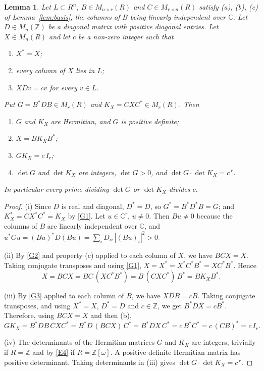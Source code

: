 \documentclass[11pt,a4paper]{article}
\newtheorem{lemma}[theorem]{Lemma}
\theoremstyle{remark}
\newcommand{\ZZ}{\mathbb{Z}}
\newcommand{\CC}{\mathbb{C}}
\begin{document}
\begin{lemma}\label{lem:gram}
Let $L\subset R^n$, $B\in M_{n\times r}(R)$ and $C\in M_{r\times n}(R)$ satisfy (a), (b), (c) of
Lemma~\ref{lem:basis}, the columns of $B$ being linearly independent over $\CC$. Let $D\in M_n(\ZZ)$ be a diagonal
matrix with positive diagonal entries. Let $X\in M_n(R)$ and let $c$ be a non-zero integer such that
\begin{enumerate}[label=(G\arabic*),leftmargin=3em]
\item\label{G1} $X^*=X$;
\item\label{G2} every column of $X$ lies in $L$;
\item\label{G3} $XDv=cv$ for every $v\in L$.
\end{enumerate}
Put $G=B^*DB\in M_r(R)$ and $K_X=CXC^*\in M_r(R)$. Then
\begin{enumerate}[label=(\roman*)]
\item $G$ and $K_X$ are Hermitian, and $G$ is positive definite;
\item $X=BK_XB^*$;
\item $GK_X=c\,I_r$;
\item $\det G$ and $\det K_X$ are integers, $\det G>0$, and $\det G\cdot\det K_X=c^{\,r}$.
\end{enumerate}
In particular every prime dividing $\det G$ or $\det K_X$ divides $c$.
\end{lemma}
\begin{proof}
(i) Since $D$ is real and diagonal, $D^*=D$, so $G^*=B^*D^*B=G$; and $K_X^*=CX^*C^*=K_X$ by \ref{G1}. Let
$u\in\CC^r$, $u\ne0$. Then $Bu\ne0$ because the columns of $B$ are linearly independent over $\CC$, and
$u^*Gu=(Bu)^*D(Bu)=\sum_iD_{ii}\,|(Bu)_i|^2>0$.

(ii) By \ref{G2} and property (c) applied to each column of $X$, we have $BCX=X$. Taking conjugate transposes and
using \ref{G1}, $X=X^*=X^*C^*B^*=XC^*B^*$. Hence
\[
X=BCX=BC\,(XC^*B^*)=B\,(CXC^*)\,B^*=BK_XB^*.
\]

(iii) By \ref{G3} applied to each column of $B$, we have $XDB=cB$. Taking conjugate transposes, and using
$X^*=X$, $D^*=D$ and $c\in\ZZ$, we get $B^*DX=cB^*$. Therefore, using $BCX=X$ and then (b),
\[
GK_X=B^*DB\,CXC^*=B^*D\,(BCX)\,C^*=B^*DX\,C^*=c\,B^*C^*=c\,(CB)^*=c\,I_r .
\]

(iv) The determinants of the Hermitian matrices $G$ and $K_X$ are integers, trivially if $R=\ZZ$ and by \ref{E4}
if $R=\ZZ[\omega]$. A positive definite Hermitian matrix has positive determinant. Taking determinants in (iii)
gives $\det G\cdot\det K_X=c^{\,r}$.
\end{proof}
\end{document}
